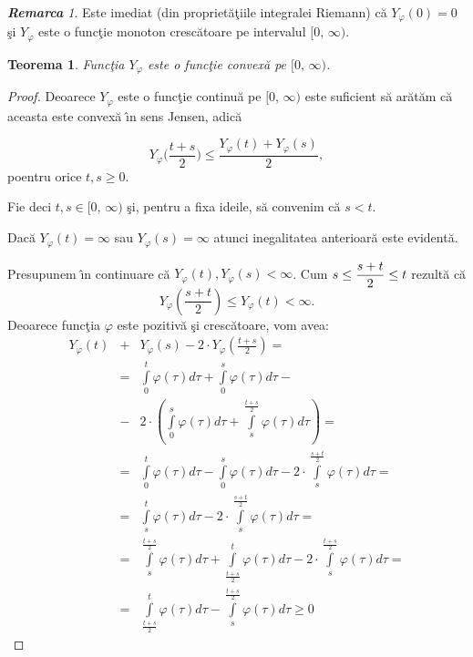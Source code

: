 \documentclass[ a4paper, 12pt]{report}
\newtheorem{theorem}{\bf Teorema}[section]
\theoremstyle{definition}
\theoremstyle{remark}
\newtheorem{remarc}{\bf Remarca}[section]
\numberwithin{equation}{section}
\begin{document}
\begin{remarc} Este imediat (din propriet\u a\c tiile integralei Riemann) c\u a $Y_\varphi (0) = 0$ \c si $Y_\varphi$ este o func\c tie monoton cresc\u atoare pe intervalul $[0,\, \infty)$.
\end{remarc}

\begin{theorem}
Func\c tia $Y_\varphi$ este o func\c tie convex\u a pe $[0,\, \infty)$.
\end{theorem}

\begin{proof} Deoarece $Y_\varphi$ este o func\c tie continu\u a pe $[0,\, \infty)$ este suficient s\u a ar\u at\u am c\u a aceasta este convex\u a \^\i n sens Jensen, adic\u a

$$Y_\varphi\Big(\frac{t+s}{2}\Big)\leq \frac{Y_\varphi(t) + Y_\varphi (s)}{2},$$  poentru orice $t,s\geq 0$.

Fie deci $t, s \in [0, \, \infty)$ \c si, pentru a fixa ideile, s\u a convenim c\u a $s < t$.

Dac\u a $Y_\varphi (t) = \infty$ sau $Y_\varphi (s) = \infty$ atunci inegalitatea anterioar\u a este evident\u a.

Presupunem \^\i n continuare c\u a $Y_\varphi (t),Y_\varphi (s) < \infty$. Cum $s\leq \displaystyle\frac{s+t}{2} \leq t$ rezult\u a c\u a
$$Y_\varphi \left(\frac{s+t}{2}\right) \leq Y_\varphi (t)<\infty.$$
Deoarece func\c tia $\varphi$ este pozitiv\u a \c si cresc\u atoare, vom avea:
\begin{eqnarray*}
Y_\varphi (t) &+& Y_\varphi (s) - 2 \cdot Y_\varphi \left(\frac{t+s}{2}\right)=\\
&=&\int\limits_{0}^{t} \varphi(\tau)d\tau + \int\limits_{0}^{s} \varphi(\tau)d\tau - \\
&-&2 \cdot \left(\int\limits_{0}^{s} \varphi(\tau)d\tau + \int\limits_{s}^{\frac{t+s}{2}} \varphi(\tau)d\tau\right)=\\
&=&\int\limits_{0}^{t} \varphi(\tau)d\tau - \int\limits_{0}^{s} \varphi(\tau)d\tau - 2 \cdot \int\limits_{s}^{\frac{s+t}{2}} \varphi(\tau)d\tau =\\
&=&\int\limits_{s}^{t} \varphi(\tau)d\tau - 2 \cdot\int\limits_{s}^{\frac{s+t}{2}} \varphi(\tau)d\tau=\\
&=&\int\limits_{s}^{\frac{t+s}{2}} \varphi(\tau)d\tau + \int\limits_{\frac{t+s}{2}}^{t} \varphi(\tau)d\tau - 2 \cdot \int\limits_{s}^{\frac{t+s}{2}}\varphi(\tau)d\tau=\\
&=&\int\limits_{\frac{t+s}{2}}^{t} \varphi(\tau)d\tau - \int\limits_{s}^{\frac{t+s}{2}} \varphi(\tau)d\tau \geq 0
\end{eqnarray*}

\end{proof}
\end{document}
